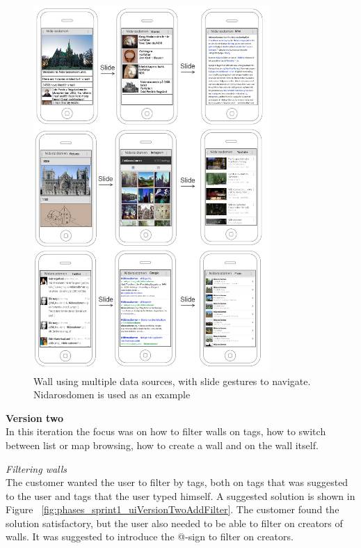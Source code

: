 \documentclass[11pt]{book}
\begin{document}
\begin{figure}[H]
    \centering
    \includegraphics[width=0.8\textwidth]{Figures/Phases/Sprint1/versiononeMultipleDataSourcesWall2.png}
    \caption{Wall using multiple data sources, with slide gestures to navigate. Nidarosdomen is used as an example}
    \label{fig:phases_sprint1_uiVersionOneMultipleDataSoruces}
\end{figure}

\textbf{Version two}\\
In this iteration the focus was on how to filter walls on tags, how to switch between list or map browsing, how to create a wall and on the wall itself. 

\textit{Filtering walls}\\
The customer wanted the user to filter by tags, both on tags that was suggested to the user and tags that the user typed himself. A suggested solution is shown in Figure ~\ref{fig:phases_sprint1_uiVersionTwoAddFilter}. The customer found the solution satisfactory, but the user also needed to be able to filter on creators of walls. It was suggested to introduce the @-sign to filter on creators.
\end{document}
